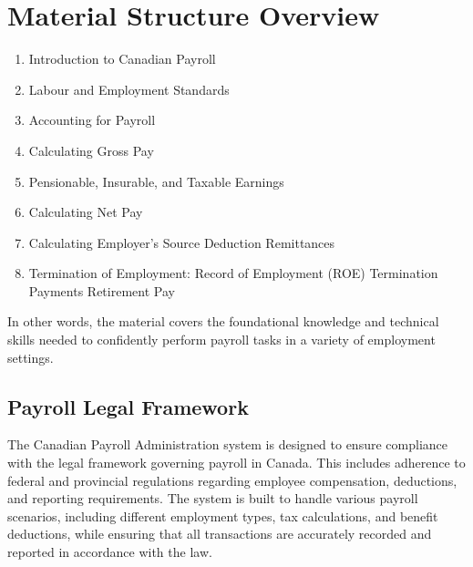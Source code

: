 \documentclass[letterpaper,10pt,english]{sphinxmanual}
\begin{document}
\section{Material Structure Overview}
\label{\detokenize{introduction:material-structure-overview}}\begin{enumerate}
%
\item {} 
\sphinxAtStartPar
Introduction to Canadian Payroll

\item {} 
\sphinxAtStartPar
Labour and Employment Standards

\item {} 
\sphinxAtStartPar
Accounting for Payroll

\item {} 
\sphinxAtStartPar
Calculating Gross Pay

\item {} 
\sphinxAtStartPar
Pensionable, Insurable, and Taxable Earnings

\item {} 
\sphinxAtStartPar
Calculating Net Pay

\item {} 
\sphinxAtStartPar
Calculating Employer’s Source Deduction Remittances

\item {} 
\sphinxAtStartPar
Termination of Employment:
\sphinxhyphen{} Record of Employment (ROE)
\sphinxhyphen{} Termination Payments
\sphinxhyphen{} Retirement Pay

\end{enumerate}

\sphinxAtStartPar
In other words, the material covers the foundational knowledge and technical skills needed to confidently perform payroll tasks in a variety of employment settings.


\subsection{Payroll Legal Framework}
\label{\detokenize{introduction:payroll-legal-framework}}
\sphinxAtStartPar
The Canadian Payroll Administration system is designed to ensure compliance with the legal framework governing payroll in Canada. This includes adherence to federal and provincial regulations regarding employee compensation, deductions, and reporting requirements.
The system is built to handle various payroll scenarios, including different employment types, tax calculations, and benefit deductions, while ensuring that all transactions are accurately recorded and reported in accordance with the law.
\end{document}
